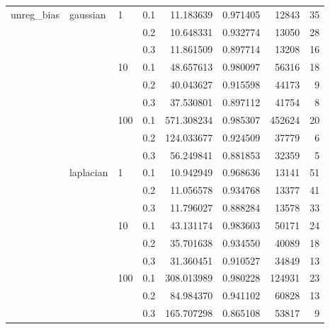 \begin{table}[H]
\begin{tabular}{llllrrrr}
unreg\_bias & gaussian & 1   & 0.1 &   11.183639 &  0.971405 &   12843 &    35 \\
           &           &     & 0.2 &   10.648331 &  0.932774 &   13050 &    28 \\
           &           &     & 0.3 &   11.861509 &  0.897714 &   13208 &    16 \\
           &           & 10  & 0.1 &   48.657613 &  0.980097 &   56316 &    18 \\
           &           &     & 0.2 &   40.043627 &  0.915598 &   44173 &     9 \\
           &           &     & 0.3 &   37.530801 &  0.897112 &   41754 &     8 \\
           &           & 100 & 0.1 &  571.308234 &  0.985307 &  452624 &    20 \\
           &           &     & 0.2 &  124.033677 &  0.924509 &   37779 &     6 \\
           &           &     & 0.3 &   56.249841 &  0.881853 &   32359 &     5 \\
           & laplacian & 1   & 0.1 &   10.942949 &  0.968636 &   13141 &    51 \\
           &           &     & 0.2 &   11.056578 &  0.934768 &   13377 &    41 \\
           &           &     & 0.3 &   11.796027 &  0.888284 &   13578 &    33 \\
           &           & 10  & 0.1 &   43.131174 &  0.983603 &   50171 &    24 \\
           &           &     & 0.2 &   35.701638 &  0.934550 &   40089 &    18 \\
           &           &     & 0.3 &   31.360451 &  0.910527 &   34849 &    13 \\
           &           & 100 & 0.1 &  308.013989 &  0.980228 &  124931 &    23 \\
           &           &     & 0.2 &   84.984370 &  0.941102 &   60828 &    13 \\
           &           &     & 0.3 &  165.707298 &  0.865108 &   53817 &     9 \\
\bottomrule
\end{tabular}
\end{table}
